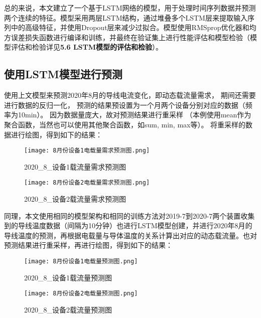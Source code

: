 \documentclass[withoutpreface,bwprint]{cumcmthesis}  %
\begin{document}
        总的来说，本文建立了一个基于LSTM网络的模型，用于处理时间序列数据并预测两个连续的特征。模型采用两层LSTM结构，通过堆叠多个LSTM层来提取输入序列中的高级特征，并使用Dropout层来减少过拟合。模型使用RMSprop优化器和均方误差损失函数进行编译和训练，并最终在验证集上进行性能评估和模型检验（模型评估和检验详见\textbf{5.6 LSTM模型的评估和检验}）。

	\subsection {使用LSTM模型进行预测}
	      使用上文模型来预测2020年8月的导线电流变化，即动态载流量需求，
            期间还需要进行数据的反归一化，
            预测的结果预设置为一个月两个设备分别对应的数据（频率为10min）。
            因为数据量庞大，故对预测结果进行重采样
            （本例使用mean作为聚合函数，当然也可以使用其他聚合函数，如sum, min, max等）。
            将重采样的数据进行绘图，得到如下的结果：
            
        \begin{figure}[htbp] 
            \begin{minipage}{.48\textwidth} %
                \centering  
                \texttt{[image: 8月份设备1电载量需求预测图.png]}  
                \caption{2020\_8\_设备1载流量需求预测图}  
            \end{minipage}  
            \hfill %
            \begin{minipage}{.48\textwidth} %
                \centering  
                \texttt{[image: 8月份设备2电载量需求预测图.png]}  
                \caption{2020\_8\_设备2载流量需求预测图}  
            \end{minipage}  
        \end{figure}

        同理，本文使用相同的模型架构和相同的训练方法对2019-7到2020-7两个装置收集到的导线温度数据（间隔为10分钟）也进行LSTM模型创建，并进行2020年8月的导线温度的预测，再根据电载量与导体温度的关系计算出对应的动态载流量。也对预测结果进行重采样，再进行绘图，得到如下的结果：

        \begin{figure}[htbp] 
            \begin{minipage}{.48\textwidth} %
                \centering  
                \texttt{[image: 8月份设备1电载量预测图.png]}  
                \caption{2020\_8\_设备1载流量预测图}  
            \end{minipage}  
            \hfill %
            \begin{minipage}{.48\textwidth} %
                \centering  
                \texttt{[image: 8月份设备2电载量预测图.png]}  
                \caption{2020\_8\_设备2载流量预测图}  
            \end{minipage}  
        \end{figure}
        
\end{document}
